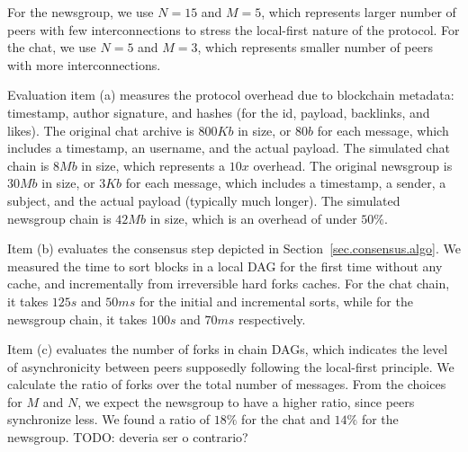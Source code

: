 \documentclass[10pt,journal,compsoc]{IEEEtran}
\newcommand{\FC}       {Freechains\xspace}
\newcommand{\code}[1]  {\texttt{\footnotesize{#1}}}
\begin{document}
For the newsgroup, we use $N=15$ and $M=5$, which represents larger number of
peers with few interconnections to stress the local-first nature of the
protocol.
For the chat, we use $N=5$ and $M=3$, which represents smaller number of peers
with more interconnections.

Evaluation item (a) measures the protocol overhead due to blockchain metadata:
timestamp, author signature, and hashes (for the id, payload, backlinks, and
likes).
%
The original chat archive is $800Kb$ in size, or $80b$ for each message, which
includes a timestamp, an username, and the actual payload.
The simulated chat chain is $8Mb$ in size, which represents a $10x$ overhead.
The original newsgroup is $30Mb$ in size, or $3Kb$ for each message, which
includes a timestamp, a sender, a subject, and the actual payload (typically
much longer).
The simulated newsgroup chain is $42Mb$ in size, which is an overhead of under
$50\%$.

Item (b) evaluates the consensus step depicted in
Section~\ref{sec.consensus.algo}.
We measured the time to sort blocks in a local DAG for the first time without
any cache, and incrementally from irreversible hard forks caches.
%
For the chat chain, it takes $125s$ and $50ms$ for the initial and incremental
sorts, while for the newsgroup chain, it takes $100s$ and $70ms$ respectively.
%

Item (c) evaluates the number of forks in chain DAGs, which indicates the level
of asynchronicity between peers supposedly following the local-first principle.
We calculate the ratio of forks over the total number of messages.
From the choices for $M$ and $N$, we expect the newsgroup to have a higher
ratio, since peers synchronize less.
We found a ratio of $18\%$ for the chat and $14\%$ for the newsgroup.
TODO: deveria ser o contrario?
\end{document}
